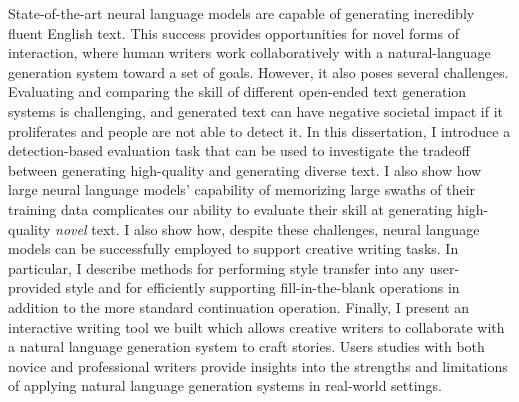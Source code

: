 \begin{center}
{\Large \mytitle}

\vspace{2cm}

{\Large{}}
\end{center}

State-of-the-art neural language models are capable of generating incredibly fluent English text.
This success provides opportunities for novel forms of interaction, where human writers work collaboratively with a natural-language generation system toward a set of goals.
However, it also poses several challenges.
Evaluating and comparing the skill of different open-ended text generation systems is challenging, and generated text can have negative societal impact if it proliferates and people are not able to detect it.
In this dissertation, I introduce a detection-based evaluation task that can be used to investigate the tradeoff between generating high-quality and generating diverse text.
I also show how large neural language models' capability of memorizing large swaths of their training data complicates our ability to evaluate their skill at generating high-quality \textit{novel} text.
I also show how, despite these challenges, neural language models can be successfully employed to support creative writing tasks.
In particular, I describe methods for performing style transfer into any user-provided style and for efficiently supporting fill-in-the-blank operations in addition to the more standard continuation operation.
Finally, I present an interactive writing tool we built which allows creative writers to collaborate with a natural language generation system to craft stories.
Users studies with both novice and professional writers provide insights into the strengths and limitations of applying natural language generation systems in real-world settings.
